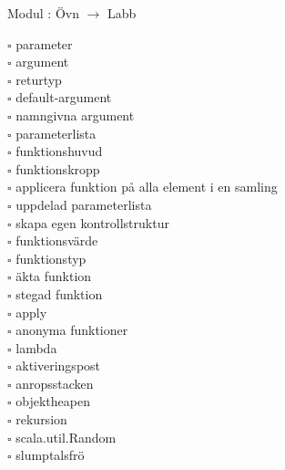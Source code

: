 
    Modul : Övn  $\rightarrow$ Labb 
    \begin{multicols}{3}\SlideFontTiny
    $\square$ parameter \\
$\square$ argument \\
$\square$ returtyp \\
$\square$ default-argument \\
$\square$ namngivna argument \\
$\square$ parameterlista \\
$\square$ funktionshuvud \\
$\square$ funktionskropp \\
$\square$ applicera funktion på alla element i en samling \\
$\square$ uppdelad parameterlista \\
$\square$ skapa egen kontrollstruktur \\
$\square$ funktionsvärde \\
$\square$ funktionstyp \\
$\square$ äkta funktion \\
$\square$ stegad funktion \\
$\square$ apply \\
$\square$ anonyma funktioner \\
$\square$ lambda \\
$\square$ aktiveringspost \\
$\square$ anropsstacken \\
$\square$ objektheapen \\
$\square$ rekursion \\
$\square$ scala.util.Random \\
$\square$ slumptalsfrö \\
    \end{multicols}
    